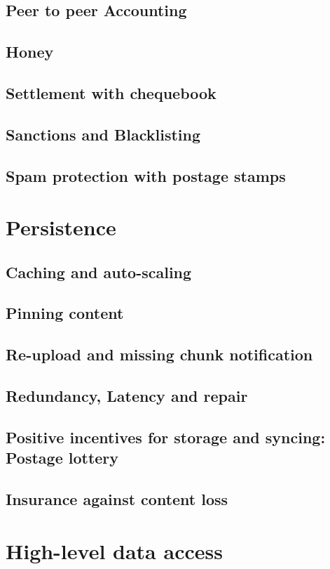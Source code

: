 \documentclass[a4paper,10pt,fullpage]{article}
\numberwithin{equation}{section}
\theoremstyle{definition}
\begin{document}
\subsection{Peer to peer Accounting}
\subsection{Honey}
\subsection{Settlement with chequebook}
\subsection{Sanctions and Blacklisting}
\subsection{Spam protection with postage stamps}

\section{Persistence}
\subsection{Caching and auto-scaling}
\subsection{Pinning content}
\subsection{Re-upload and missing chunk notification}
\subsection{Redundancy, Latency and repair}
\subsection{Positive incentives for storage and syncing: Postage lottery}
\subsection{Insurance against content loss}

\section{High-level data access}
\end{document}
